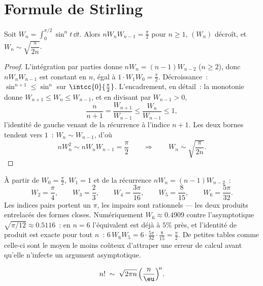 \section{Formule de Stirling}

\begin{lemma}\label{lem:b2:comparison:wallis}
Soit $W_n = \int_0^{\pi/2} \sin^n t\,\dd t$. Alors $nW_nW_{n-1} =
\frac\pi2$ pour $n \geq 1$, $(W_n)$ décroît, et $W_n \sim
\sqrt{\dfrac{\pi}{2n}}$.
\end{lemma}

\begin{proof}
L'intégration par parties donne $nW_n = (n-1)W_{n-2}$ ($n \geq 2$),
donc $nW_nW_{n-1}$ est constant en $n$, égal à $1 \cdot W_1 W_0 =
\frac\pi2$. Décroissance~: $\sin^{n+1} \leq \sin^n$ sur
$\intcc{0}{\frac\pi2}$. L'encadrement, en détail~: la monotonie
donne $W_{n+1} \leq W_n \leq W_{n-1}$, et en divisant par $W_{n-1}
> 0$,
\[
\frac{n}{n+1} = \frac{W_{n+1}}{W_{n-1}} \leq
\frac{W_n}{W_{n-1}} \leq 1 ,
\]
l'identité de gauche venant de la récurrence à l'indice $n + 1$. Les
deux bornes tendent vers $1$~: $W_n \sim W_{n-1}$, d'où
\[
nW_n^2 \sim nW_nW_{n-1} = \frac\pi2
\qquad\Longrightarrow\qquad
W_n \sim \sqrt{\frac{\pi}{2n}} .
\]
\end{proof}

\begin{example}\label{ex:b2:comparison:wallisvalues}
À partir de $W_0 = \frac\pi2$, $W_1 = 1$ et de la récurrence $nW_n =
(n-1)W_{n-2}$~:
\[
W_2 = \frac\pi4, \qquad
W_3 = \frac23, \qquad
W_4 = \frac{3\pi}{16}, \qquad
W_5 = \frac{8}{15}, \qquad
W_6 = \frac{5\pi}{32}.
\]
Les indices pairs portent un $\pi$, les impairs sont rationnels --- les
deux produits entrelacés des formes closes. Numériquement $W_6
\approx 0.4909$ contre l'asymptotique
$\sqrt{\pi/12} \approx 0.5116$~: en $n = 6$ l'équivalent est
déjà à $5\%$ près, et l'identité de produit est exacte pour tout
$n$~: $6\,W_6W_5 = 6\cdot\frac{5\pi}{32}\cdot\frac8{15} =
\frac\pi2$. De petites tables comme celle-ci sont le moyen le moins
coûteux d'attraper une erreur de calcul avant qu'elle n'infecte un
argument asymptotique.
\end{example}

\begin{theorem}[Stirling]\label{thm:b2:comparison:stirling}
\[
n! \;\sim\; \sqrt{2\pi n}\, \Bigl(\frac{n}{\eu}\Bigr)^{\!n}
.\index{formule de Stirling}
\]
\end{theorem}

